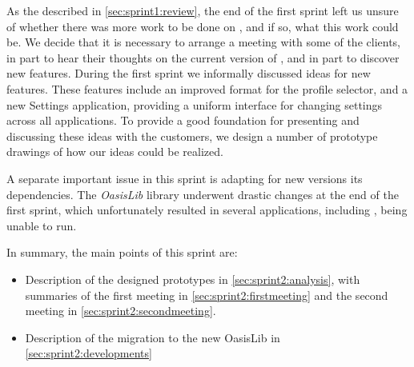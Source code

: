 As the described in \cref{sec:sprint1:review}, the end of the first sprint left us unsure of whether there was more work to be done on \launcher, and if so, what this work could be. 
We decide that it is necessary to arrange a meeting with some of the clients, in part to hear their thoughts on the current version of \launcher, and in part to discover new features.
During the first sprint we informally discussed ideas for new features.
These features include an improved format for the profile selector, and a new Settings application, providing a uniform interface for changing settings across all applications. 
To provide a good foundation for presenting and discussing these ideas with the customers, we design a number of prototype drawings of how our ideas could be realized.

A separate important issue in this sprint is adapting \launcher for new versions its dependencies. 
The \textit{OasisLib} library underwent drastic changes at the end of the first sprint, which unfortunately resulted in several applications, including \launcher, being unable to run.

In summary, the main points of this sprint are:

\begin{itemize}
\item Description of the designed prototypes in \cref{sec:sprint2:analysis}, with summaries of the first meeting in \cref{sec:sprint2:firstmeeting} and the second meeting in \cref{sec:sprint2:secondmeeting}.
\item Description of the migration to the new OasisLib in \cref{sec:sprint2:developments}
\end{itemize}